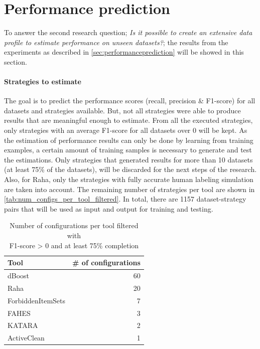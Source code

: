 \newpage
\section{Performance prediction}
To answer the second research question; \textit{Is it possible to create an extensive data profile to estimate performance on
unseen datasets?}; the results from the experiments as described in \autoref{sec:performanceprediction} will be showed in this section. 

\paragraph{Strategies to estimate} The goal is to predict the performance scores (recall, precision \& F1-score) for all datasets and strategies available. But, not all strategies were able to produce results that are meaningful enough to estimate. From all the executed strategies, only strategies with an average F1-score for all datasets over 0 will be kept. As the estimation of performance results can only be done by learning from training examples, a certain amount of training samples is necessary to generate and test the estimations. Only strategies that generated results for more than 10 datasets (at least 75\% of the datasets), will be discarded for the next steps of the research. Also, for Raha, only the strategies with fully accurate human labeling simulation are taken into account. The remaining number of strategies per tool are shown in \autoref{tab:num_configs_per_tool_filtered}. In total, there are 1157 dataset-strategy pairs that will be used as input and output for training and testing. 

\begin{table}[h]
\centering
\begin{tabular}{lr}
\toprule
Tool         &  \# of configurations \\
\midrule
dBoost            &    60 \\
Raha              &    20 \\
ForbiddenItemSets &     7 \\
FAHES             &     3 \\
KATARA            &     2 \\
ActiveClean       &     1 \\
\bottomrule
\end{tabular}
\caption{Number of configurations per tool filtered with \\F1-score > 0 and at least 75\% completion}
\label{tab:num_configs_per_tool_filtered}
\end{table}

